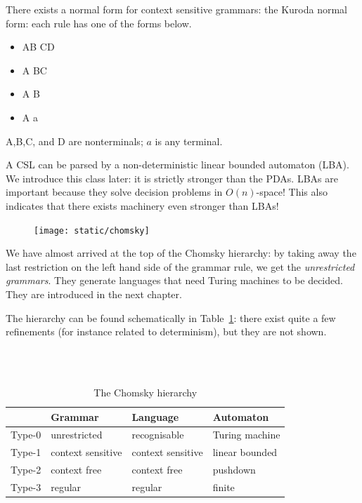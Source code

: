 There exists a normal form for context sensitive grammars: the Kuroda
normal form: each rule has one of the forms below.

\begin{itemize}
\item[] AB \rpijl CD
\item[] A \rpijl BC
\item[] A \rpijl B
\item[] A \rpijl a
\end{itemize}

A,B,C, and D are nonterminals; $a$ is any terminal.


A CSL can be parsed by a non-deterministic linear bounded automaton
(LBA). We introduce this class later: it is strictly stronger than the
PDAs. LBAs are important because they solve decision problems in
$O(n)$-space! This also indicates that there exists machinery even
stronger than LBAs!


\begin{figure}
\texttt{[image: static/chomsky]}
\end{figure}
We have almost arrived at the top of the Chomsky hierarchy: by taking
away the last restriction on the left hand side of the grammar rule,
we get the {\em unrestricted grammars}. They generate languages that
need Turing machines to be decided. They are introduced in the next
chapter.

The hierarchy can be found schematically in Table~\ref{chomskyhier}:
there exist quite a few refinements (for instance related to
determinism), but they are not shown.

~\\
~\\
\begin{table}[ht]
\center
\begin{tabular}{|l|l|l|l|}
\hline
         & Grammar          & Language              & Automaton \\ \hline
Type-0   & unrestricted        & recognisable      & Turing machine \\
Type-1   & context sensitive   & context sensitive & linear bounded   \\
Type-2   & context free        & context free      & pushdown \\
Type-3   & regular            & regular          & finite  \\
\hline
\end{tabular}
\caption{The Chomsky hierarchy} \label{chomskyhier}
\end{table}


